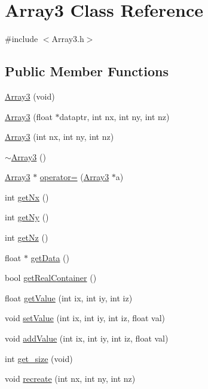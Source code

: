 \section{Array3 Class Reference}
\label{classArray3}


{\ttfamily \#include $<$Array3.h$>$}

\subsection*{Public Member Functions}
\begin{DoxyCompactItemize}
\item 
\hyperlink{classArray3_a4ee25bec9b5a58da143533e55bd5f1af}{Array3} (void)
\item 
\hyperlink{classArray3_a91525ed4449aa68d02727ab646f53d1f}{Array3} (float $\ast$dataptr, int nx, int ny, int nz)
\item 
\hyperlink{classArray3_a5eaf94a79b17fa9d4254267edf6bed63}{Array3} (int nx, int ny, int nz)
\item 
\hyperlink{classArray3_a2efbbb3070df605bb7a71c65771b0d46}{$\sim$Array3} ()
\item 
\hyperlink{classArray3}{Array3} $\ast$ \hyperlink{classArray3_a94c897c53a7dd53b61d9cc89dfa0d708}{operator=} (\hyperlink{classArray3}{Array3} $\ast$a)
\item 
int \hyperlink{classArray3_aadb24645a52627aba3cc36b6378df78c}{getNx} ()
\item 
int \hyperlink{classArray3_af29d2eab1f67d70a5430c438d54026f2}{getNy} ()
\item 
int \hyperlink{classArray3_ab4eecc4fa31e18f0ce10ea7848e5b814}{getNz} ()
\item 
float $\ast$ \hyperlink{classArray3_a246734002eb950cfce43b63cf9b1ec4f}{getData} ()
\item 
bool \hyperlink{classArray3_a38b29b4540631fbdeba40c44bc97a0b7}{getRealContainer} ()
\item 
float \hyperlink{classArray3_a7cf0475d19ea0f88976694dd61ae9f85}{getValue} (int ix, int iy, int iz)
\item 
void \hyperlink{classArray3_ac07bb97510a09e2dc5121ee9ed36af3c}{setValue} (int ix, int iy, int iz, float val)
\item 
void \hyperlink{classArray3_a3693476b41ac4fccd86c2acfa7960053}{addValue} (int ix, int iy, int iz, float val)
\item 
int \hyperlink{classArray3_a7b1da51445317025d5727927b1cd853d}{get\_\-size} (void)
\item 
void \hyperlink{classArray3_a089a93d07ebfdc31376291dd1475e800}{recreate} (int nx, int ny, int nz)
\end{DoxyCompactItemize}
